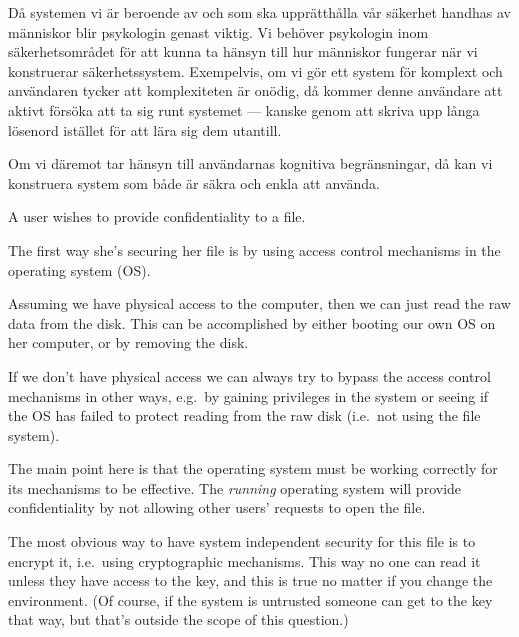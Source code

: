   \begin{solution}
    Då systemen vi är beroende av och som ska upprätthålla vår säkerhet 
    handhas av människor blir psykologin genast viktig.
    Vi behöver psykologin inom säkerhetsområdet för att kunna ta hänsyn till 
    hur människor fungerar när vi konstruerar säkerhetssystem.
    Exempelvis, om vi gör ett system för komplext och användaren tycker att 
    komplexiteten är onödig, då kommer denne användare att aktivt försöka att 
    ta sig runt systemet --- kanske genom att skriva upp långa lösenord 
    istället för att lära sig dem utantill.

    Om vi däremot tar hänsyn till användarnas kognitiva begränsningar, då kan 
    vi konstruera system som både är säkra och enkla att använda.
  \end{solution}
\question[3]\label{q:trustcomp:crypto:E:C}
  A user wishes to provide confidentiality to a file.

  \begin{solution}
    The first way she's securing her file is by using access control mechanisms 
    in the operating system (OS).

    Assuming we have physical access to the computer, then we can just read the 
    raw data from the disk.
    This can be accomplished by either booting our own OS on her computer, or 
    by removing the disk.

    If we don't have physical access we can always try to bypass the access 
    control mechanisms in other ways, e.g.\ by gaining privileges in the system 
    or seeing if the OS has failed to protect reading from the raw disk (i.e.\ 
    not using the file system).

    The main point here is that the operating system must be working correctly 
    for its mechanisms to be effective.
    The \emph{running} operating system will provide confidentiality by not 
    allowing other users' requests to open the file.

    The most obvious way to have system independent security for this file is 
    to encrypt it, i.e.~using cryptographic mechanisms.
    This way no one can read it unless they have access to the key, and this is 
    true no matter if you change the environment.
    (Of course, if the system is untrusted someone can get to the key that way, 
    but that's outside the scope of this question.)
  \end{solution}


